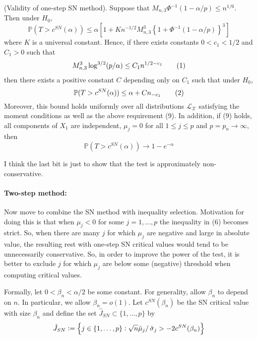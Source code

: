 \begin{theorem}
	(Validity of one-step SN method). Suppose that $M_{n,3}\Phi^{-1}(1-\alpha/p) \leq n^{1/6}$. Then under $H_0$, 
	\[\mathbb{P}(T > c^{SN}(\alpha)) \leq \alpha\left[1 + Kn^{-1/2}M_{n,3}^3\left\{1 + \Phi^{-1}(1-\alpha/p) \right\}^3\right]\]
	where $K$ is a universal constant. Hence, if there exists constants $0 < c_1 < 1/2$ and $C_1 > 0$ such that 
	\[M_{n,3}^3\log^{3/2}(p/\alpha) \leq C_1 n^{1/2 - c_1}\numberthis\]
	then there exists a positive constant $C$ depending only on $C_1$ such that under $H_0$,
	\[\mathbb{P}(T > c^{SN}(\alpha)) \leq \alpha + Cn_{-c_1}\numberthis\]
	Moreover, this bound holds uniformly over all distributions $\mathscr{L_X}$ satisfying the moment conditions as well as the above requirement (9). In addition, if (9) holds, all components of $X_1$ are independent, $\mu_j = 0$ for all $1 \leq j \leq p$ and $p = p_n \rightarrow \infty$, then 
	\[\mathbb{P}(T > c^{SN}(\alpha)) \rightarrow 1 - e^{-\alpha}\]
\end{theorem}
I think the last bit is just to show that the test is approximately non-conservative. 

\paragraph{Two-step method:} Now move to combine the SN method with inequality selection. Motivation for doing this is that when $\mu_j < 0$ for some $j = 1, \dots, p$ the inequality in (6) becomes strict. So, when there are many $j$ for which $\mu_j$ are negative and large in absolute value, the resulting rest with one-step SN critical values would tend to be unnecessarily conservative. So, in order to improve the power of the test, it is better to exclude $j$ for which $\mu_j$ are below some (negative) threshold when computing critical values.  

Formally, let $0 < \beta_n < \alpha/2$ be some constant. For generality, allow $\beta_n$ to depend on $n$. In particular, we allow $\beta_n = o(1)$. Let $c^{SN}(\beta_n)$ be the SN critical value with size $\beta_n$ and define the set $\hat{J}_{SN} \subset \{1,\dots,p\}$ by 
\begin{equation}
	\label{eq:J-SN}
	\hat{J}_{SN} := \left\{j \in \{1,\dots, p\}: \sqrt{n}\hat{\mu}_j/\operatorname{\hat{\sigma}}_j > -2c^{SN}(\beta_n)\right\}
\end{equation}

